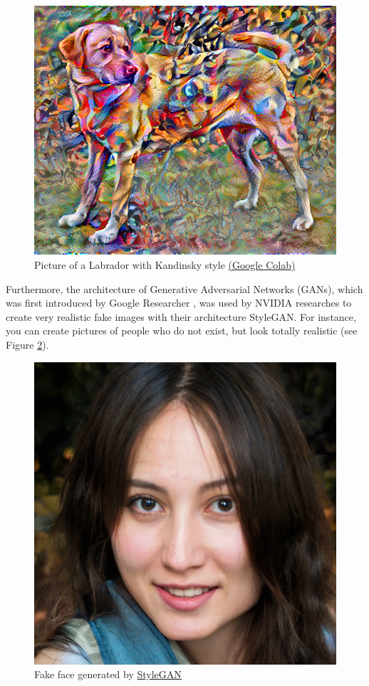\documentclass[
]{krantz}
\begin{document}
\begin{figure}

{\centering \includegraphics[width=0.5\linewidth]{./figures/03-chapter3/Kandinsky} 

}

\caption{Picture of a Labrador with Kandinsky style \href{https://www.tensorflow.org/tutorials/generative/style_transfer}{(Google Colab)}}\label{fig:StyleTransfer2}
\end{figure}



Furthermore, the architecture of Generative Adversarial Networks (GANs), which was first introduced by Google Researcher \citet{NIPS2014_5ca3e9b1}, was used by NVIDIA researches \citet{karras2019style} to create very realistic fake images with their architecture StyleGAN. For instance, you can create pictures of people who do not exist, but look totally realistic (see Figure \ref{fig:GAN}).

\begin{figure}

{\centering \includegraphics[width=0.5\linewidth]{./figures/03-chapter3/StyleGAN} 

}

\caption{Fake face generated by \href{https://thispersondoesnotexist.com/}{StyleGAN}}\label{fig:GAN}
\end{figure}
\end{document}
